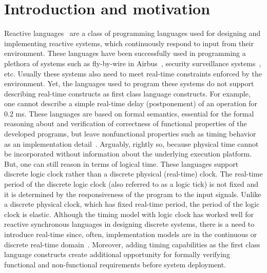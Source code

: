 \section{Introduction and motivation}
\label{sec:intr-motiv}

Reactive languages~\cite{gber931,amal10} are a class of programming
languages used for designing and implementing reactive systems, which
continuously respond to input from their environment. These languages
have been successfully used in programming a plethora of systems such as
fly-by-wire in Airbus~\cite{eairbus}, security surveillance
systems~\cite{amal121}, etc.  Usually these systems also need to meet
real-time constraints enforced by the environment.  Yet, the languages
used to program these systems do not support describing real-time
constructs as first class language constructs.  For example, one cannot
describe a simple real-time delay (postponement) of an operation for 0.2
ms. These languages are based on formal semantics, essential for the
formal reasoning about and verification of correctness of functional
properties of the developed programs, but leave nonfunctional properties
such as timing behavior as an implementation
detail~\cite{boldt07}. Arguably, rightly so, because physical time
cannot be incorporated without information about the underlying
execution platform.  But, one can still reason in terms of logical
time. These languages support discrete logic clock rather than a
discrete physical (real-time) clock. The real-time period of the
discrete logic clock (also referred to as a logic tick) is not fixed and
it is determined by the responsiveness of the program to the input
signals. Unlike a discrete physical clock, which has fixed real-time
period, the period of the logic clock is elastic. Although the timing
model with logic clock has worked well for reactive synchronous
languages in designing discrete systems, there is a need to introduce
real-time since, often, implementation models are in the continuous or
discrete real-time domain~\cite{DBLP:journals/pieee/SifakisTY03}.
Moreover, adding timing capabilities as the ﬁrst class language
constructs create additional opportunity for formally verifying
functional and non-functional requirements before system deployment.



